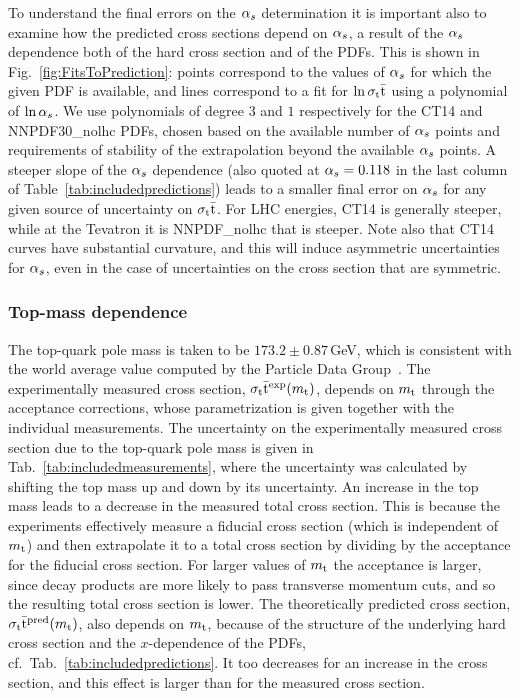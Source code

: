 To understand the final errors on the $\alpha_s$ determination it is
important also to examine how the predicted cross sections depend on
$\alpha_s$, a result of the $\alpha_s$ dependence both of the hard cross section
and of the PDFs.
%
This is shown in Fig.~\ref{fig:FitsToPrediction}: points correspond
to the values of $\alpha_s$ for which the given PDF is available, and lines
correspond to a fit for $\ln \sigma_\mathrm{t}\bar{\mathrm{t}}$ using a polynomial of $\ln \alpha_s$. 
%
We use polynomials of degree $3$ and $1$ respectively for the CT14 and
NNPDF30\_nolhc PDFs, chosen based on the available number of $\alpha_s$ points and
requirements of stability of the extrapolation beyond the available
$\alpha_s$ points.
%
A steeper slope of the $\alpha_s$ dependence (also quoted at $\alpha_s=0.118$ in
the last column of Table~\ref{tab:includedpredictions})
leads to a smaller final error on $\alpha_s$ for any given source of
uncertainty on $\sigma_\mathrm{t}\bar{\mathrm{t}}$. 
%
For LHC energies, CT14 is generally steeper, while at the Tevatron
it is NNPDF\_nolhc that is steeper.
%
Note also that CT14 curves have substantial curvature, and this will
induce asymmetric uncertainties for $\alpha_s$, even in the case of
uncertainties on the cross section that are symmetric.



\subsubsection{Top-mass dependence}
\label{sec:top-mass-dependence}

The top-quark pole mass is taken to be $173.2 \pm 0.87\,$GeV, which
is consistent with the world average value computed by the Particle Data
Group~\cite{PDG}. 
% 
% 
The experimentally measured cross section, $\sigma_\mathrm{t}\bar{\mathrm{t}}^{\text{exp}} (m_\mathrm{t})$,
depends on $m_\mathrm{t}$ through the acceptance corrections, whose
parametrization is given together with the individual
measurements.
% 
The uncertainty on the experimentally measured cross section due to the top-quark pole mass is given in Tab.~\ref{tab:includedmeasurements}, where the uncertainty was calculated by shifting the top mass up and down by its uncertainty.
% 
An increase in the top mass leads to a decrease in the measured total
cross section.
%
This is because the experiments effectively measure a fiducial cross
section (which is independent of $m_\mathrm{t}$) and then extrapolate it to a
total cross section by dividing by the acceptance for the fiducial
cross section.
%
For larger values of $m_\mathrm{t}$ the acceptance is larger, since decay
products are more likely to pass transverse momentum cuts, and so the resulting
total cross section is lower.
% 
The theoretically predicted cross section,
$\sigma_\mathrm{t}\bar{\mathrm{t}}^{\text{pred}} ( m_\mathrm{t} )$, also depends on $m_\mathrm{t}$, because of the
structure of the underlying hard cross section and the $x$-dependence
of the PDFs, cf.\ Tab.~\ref{tab:includedpredictions}.
%
It too decreases for an increase in the cross section, and this
effect is larger than for the measured cross section.

